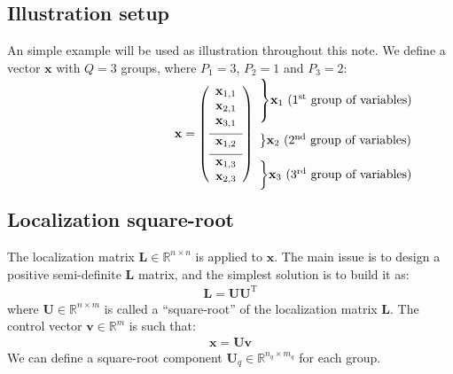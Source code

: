 \documentclass[12pt]{scrartcl}
\begin{document}
\subsection{Illustration setup}
An simple example will be used as illustration throughout this note. We define a vector $\mathbf{x}$ with $Q = 3$ groups, where $P_1 = 3$, $P_2 = 1$ and $P_3 = 2$:
\begin{align}
\begin{array}{c@{}c}
\mathbf{x} = \left( \begin{array}{c}
\mathbf{x}_{1,1} \\
\mathbf{x}_{2,1} \\
\mathbf{x}_{3,1} \\[1ex]
\hline
\mathbf{x}_{1,2} \\[1ex]
\hline
\mathbf{x}_{1,3} \\
\mathbf{x}_{2,3}
\end{array} \right)
& 
\begin{array}{l}
\\[-8.5mm] \rdelim\}{3}{6mm}[$\mathbf{x}_1$ (1$^\text{st}$ group of variables)] \\[11.5mm] \rdelim\}{1}{6mm}[$\mathbf{x}_2$ (2$^\text{nd}$ group of variables)] \\[3.5mm] \rdelim\}{2}{6mm}[$\mathbf{x}_3$ (3$^\text{rd}$ group of variables)]
\end{array} \\[-1ex]
\end{array}
\end{align}

\subsection{Localization square-root}
The localization matrix $\mathbf{L} \in \mathbb{R}^{n \times n}$ is applied to $\mathbf{x}$. The main issue is to design a positive semi-definite $\mathbf{L}$ matrix, and the simplest solution is to build it as:
\begin{align}
\mathbf{L} = \mathbf{UU}^\textrm{T}
\end{align}
where $\mathbf{U} \in \mathbb{R}^{n \times m}$ is called a ``square-root'' of the localization matrix $\mathbf{L}$. The control vector $\mathbf{v} \in \mathbb{R}^m$ is such that:
\begin{align}
\mathbf{x} = \mathbf{U} \mathbf{v}
\end{align}
We can define a square-root component $\mathbf{U}_q \in \mathbb{R}^{n_q \times m_q}$ for each group.
\end{document}
